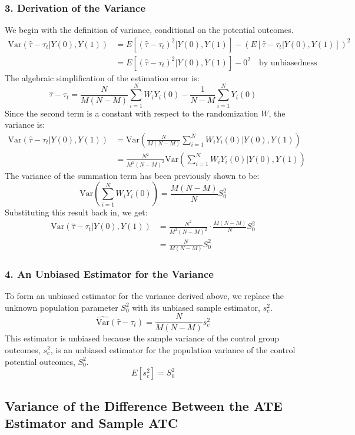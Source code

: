 \documentclass[12pt]{article}
\begin{document}
\subsubsection*{3. Derivation of the Variance}
We begin with the definition of variance, conditional on the potential outcomes.
\begin{align*}
\text{Var}(\hat{\tau} - \tau_t | Y(0), Y(1)) &= E[(\hat{\tau} - \tau_t)^2 | Y(0), Y(1)] - \left(E[\hat{\tau} - \tau_t | Y(0), Y(1)]\right)^2 \\
&= E[(\hat{\tau} - \tau_t)^2 | Y(0), Y(1)] - 0^2 \quad \text{by unbiasedness}
\end{align*}
The algebraic simplification of the estimation error is:
$$
\hat{\tau} - \tau_t = \frac{N}{M(N-M)}\sum_{i=1}^{N} W_i Y_i(0) - \frac{1}{N-M}\sum_{i=1}^{N} Y_i(0)
$$
Since the second term is a constant with respect to the randomization $W$, the variance is:
\begin{align*}
\text{Var}(\hat{\tau} - \tau_t | Y(0), Y(1)) &= \text{Var}\left(\frac{N}{M(N-M)}\sum_{i=1}^{N} W_i Y_i(0) \bigg| Y(0), Y(1)\right) \\
&= \frac{N^2}{M^2(N-M)^2} \text{Var}\left(\sum_{i=1}^{N} W_i Y_i(0) \bigg| Y(0), Y(1)\right)
\end{align*}
The variance of the summation term has been previously shown to be:
$$
\text{Var}\left(\sum_{i=1}^{N} W_i Y_i(0)\right) = \frac{M(N-M)}{N}S_0^2
$$
Substituting this result back in, we get:
\begin{align*}
\text{Var}(\hat{\tau} - \tau_t | Y(0), Y(1)) &= \frac{N^2}{M^2(N-M)^2} \cdot \frac{M(N-M)}{N}S_0^2 \\
&= \frac{N}{M(N-M)}S_0^2
\end{align*}

\subsubsection*{4. An Unbiased Estimator for the Variance}
To form an unbiased estimator for the variance derived above, we replace the unknown population parameter $S_0^2$ with its unbiased sample estimator, $s_c^2$.
$$
\widehat{\text{Var}}(\hat{\tau} - \tau_t) = \frac{N}{M(N-M)}s_c^2
$$
This estimator is unbiased because the sample variance of the control group outcomes, $s_c^2$, is an unbiased estimator for the population variance of the control potential outcomes, $S_0^2$.
$$
E[s_c^2] = S_0^2
$$


\subsection{Variance of the Difference Between the ATE Estimator and Sample ATC}
\end{document}
